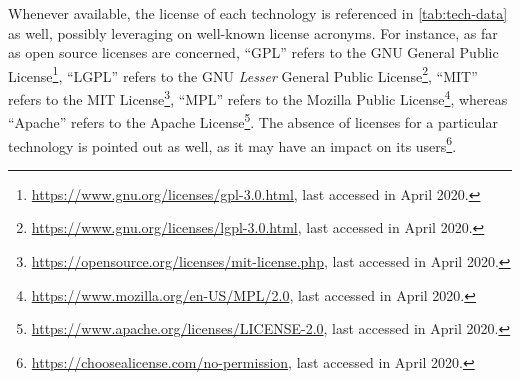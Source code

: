 \documentclass[12pt,a4paper,openright,twoside]{book}
\begin{document}
Whenever available, the license of each technology is referenced in \cref{tab:tech-data} as well, possibly leveraging on well-known license acronyms.
%
For instance, as far as open source licenses are concerned, ``GPL'' refers to the GNU General Public License\footnote{\url{https://www.gnu.org/licenses/gpl-3.0.html}, last accessed in April 2020.}, ``LGPL'' refers to the GNU \emph{Lesser} General Public License\footnote{\url{https://www.gnu.org/licenses/lgpl-3.0.html}, last accessed in April 2020.}, ``MIT'' refers to the MIT License\footnote{\url{https://opensource.org/licenses/mit-license.php}, last accessed in April 2020.}, ``MPL'' refers to the Mozilla Public License\footnote{\url{https://www.mozilla.org/en-US/MPL/2.0}, last accessed in April 2020.}, whereas ``Apache'' refers to the Apache License\footnote{\url{https://www.apache.org/licenses/LICENSE-2.0}, last accessed in April 2020.}.
%
The absence of licenses for a particular technology is pointed out as well, as it may have an impact on its users\footnote{\url{https://choosealicense.com/no-permission}, last accessed in April 2020.}.
\end{document}
